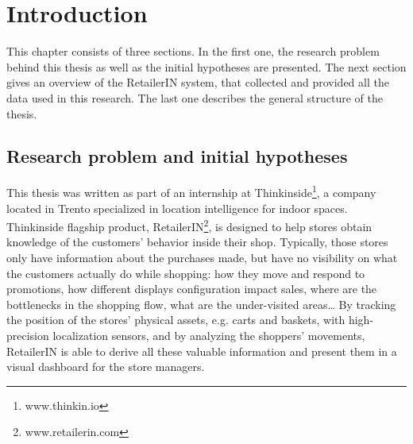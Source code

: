 \chapter{Introduction}
\label{cha:introduction}

This chapter consists of three sections. In the first one, the research problem behind this thesis as well as the initial hypotheses are presented. The next section gives an overview of the RetailerIN system, that collected and provided all the data used in this research. The last one describes the general structure of the thesis.

\section{Research problem and initial hypotheses}
\label{sec:research_problem_and_initial_hypoteses}

This thesis was written as part of an internship at Thinkinside\footnote{www.thinkin.io}, a company located in Trento specialized in location intelligence for indoor spaces. Thinkinside flagship product, RetailerIN\footnote{www.retailerin.com}, is designed to help stores obtain knowledge of the customers’ behavior inside their shop. Typically, those stores only have information about the purchases made, but have no visibility on what the customers actually do while shopping: how they move and respond to promotions, how different displays configuration impact sales, where are the bottlenecks in the shopping flow, what are the under-visited areas… By tracking the position of the stores’ physical assets, e.g. carts and baskets, with high-precision localization sensors, and by analyzing the shoppers’ movements, RetailerIN is able to derive all these valuable information and present them in a visual dashboard for the store managers.

